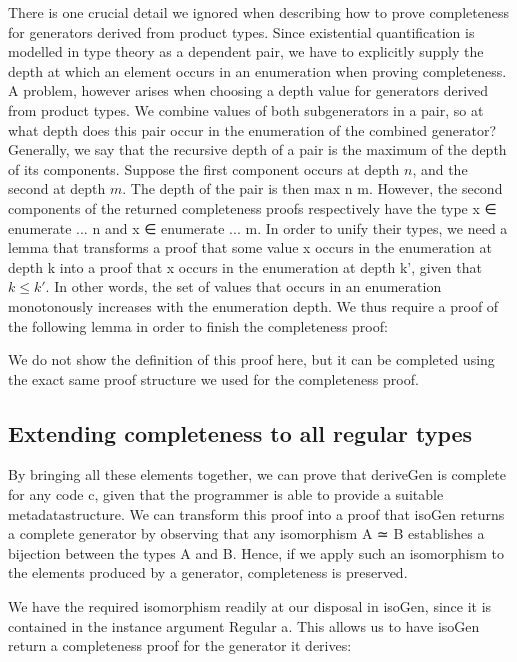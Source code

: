 \documentclass[a4paper,msc,twosized=semi]{uustthesis}
\newcommand{\agda}[1]{{\agdafontinline\color{agdacolor}#1}}
\newcommand{\includeagda}[2]{\vspace*{-0.25cm}\begin{center}{\fontsize{12}{14}\agdafont\ExecuteMetaData[../src/chap0#1/latex/code.tex]{#2}}\end{center}\vspace*{-0.25cm}}
\renewcommand{\leq}{\leqslant}
\begin{document}
  There is one crucial detail we ignored when describing how to prove completeness for 
  generators derived from product types. Since existential quantification is modelled 
  in type theory as a dependent pair, we have to explicitly supply the depth at which 
  an element occurs in an enumeration when proving completeness. A problem, however arises 
  when choosing a depth value for generators derived from 
  product types. We combine values of both subgenerators in a pair, so at what depth 
  does this pair occur in the enumeration of the combined generator? Generally, we say 
  that the recursive depth of a pair is the maximum of the depth of its components. 
  Suppose the first component occurs at depth $n$, and the second at depth $m$. The 
  depth of the pair is then \agda{max n m}. However, the second components  of the returned 
  completeness proofs respectively have the type \agda{x ∈ enumerate ... n} and \agda{x ∈ 
  enumerate ... m}. In order to unify their types, we need a lemma that transforms a 
  proof that some value \agda{x} occurs in the enumeration at depth \agda{k} into a proof that \agda{
  x} occurs in the enumeration at 
  depth \agda{k'}, given that $k \leq k'$. In other words, the set of values that occurs in 
  an enumeration monotonously increases with the enumeration depth. We thus require a 
  proof of the following lemma in order to finish the completeness proof: 

\includeagda{5}{derivegenmonotone}

  We do not show the definition of this proof here, but it can be completed using the 
  exact same proof structure we used for the completeness proof. 

\subsection{Extending completeness to all regular types}

  By bringing all these elements together, we can prove that \agda{deriveGen} is complete 
  for any code \agda{c}, given that the programmer is able to provide a suitable 
  metadatastructure. We can transform this proof into a proof that \agda{isoGen} returns a 
  complete generator by observing that any isomorphism \agda{A ≃ B} establishes a bijection 
  between the types \agda{A} and \agda{B}. Hence, if we apply such an isomorphism to the 
  elements produced by a generator, completeness is preserved. 

  We have the required isomorphism readily at our disposal in \agda{isoGen}, since it is 
  contained in the instance argument \agda{Regular a}. This allows us to have \agda{isoGen} 
  return a completeness proof for the generator it derives: 
\end{document}
